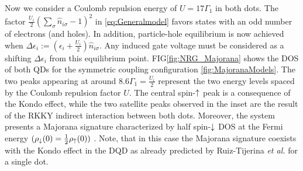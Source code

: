Now we consider a Coulomb repulsion energy of $U = 17\Gamma_1$ in both dots. The factor $ \frac{U_i}{2}(\sum_{\sigma} \hat{n}_{i\sigma}-1)^{2}$ in \eqref{eq:Generalmodel} favors states with an odd number of electrons (and holes). In addition, particle-hole equilibrium is now achieved when $\Delta \epsilon_{i} := \left(\epsilon_{i}+\frac{U_i}{2}\right)\hat{n}_{i\sigma}$.  Any induced gate voltage must be considered as a shifting $\Delta \epsilon_{i}$ from this equilibrium point. FIG\ref{fig:NRG_Majorana} shows the DOS of both QDs for the symmetric coupling configuration \ref{fig:MajoranaModels}. The two peaks appearing at around $8.6\Gamma_1 = \frac{U_i}{2}$ represent the two energy levels spaced by the Coulomb repulsion factor $U$. The central spin-$\uparrow$ peak is a consequence of the Kondo effect, \cite{hewson_kondo_1997,wilson_renormalization_1975}  while the two satellite peaks observed in the inset  are the result of the  RKKY indirect interaction between both dots.  \cite{ruderman_indirect_1954,kasuya_theory_1956,yosida_magnetic_1957} Moreover, the system presents a Majorana signature characterized by half spin-$\downarrow$ DOS at the Fermi energy $(\rho_\downarrow(0) = \frac{1}{2}\rho_\uparrow(0))$  . Note, that in this case the Majorana signature coexists with the Kondo effect in the DQD as already predicted by Ruiz-Tijerina \textit{et al.} for a single dot. \cite{ruiz-tijerina_interaction_2015}



